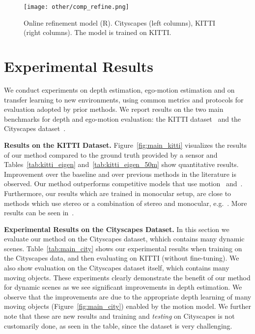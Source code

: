 \documentclass[10pt,twocolumn,letterpaper]{article}
\begin{document}
\begin{figure} [h!]
    \centering
    \texttt{[image: other/comp\_refine.png]}
    \caption{Online refinement model (R). Cityscapes (left columns), KITTI (right columns). The model is trained on KITTI.
    }
    \label{fig:kitti_refinement}
\end{figure}

\section{Experimental Results}
We conduct experiments on depth estimation, ego-motion estimation and on transfer learning to new environments, using common metrics and protocols for evaluation adopted by prior methods. We report results on the two main benchmarks for depth and ego-motion evaluation: the KITTI dataset~\cite{geiger2013vision} and the Cityscapes dataset~\cite{cordts2016cityscapes}.

\textbf{Results on the KITTI Dataset.}
Figure~\ref{fig:main_kitti} visualizes the results of our method compared to the ground truth provided by a sensor and Tables~\ref{tab:kitti_eigen} and~\ref{tab:kitti_eigen_50m} show quantitative results. Improvement over the baseline and over previous methods in the literature is observed. Our method outperforms competitive models that use motion~\cite{yang2018every} and~\cite{yin2018geonet}. 
Furthermore, our results which are trained in monocular setup, are close to methods which use stereo or a combination of stereo and monocular, e.g.~\cite{godard2017monodepth,yang2018every,godard2018digging}. More results can be seen in~\cite{casser2019depth}.

\textbf{Experimental Results on the Cityscapes Dataset.}
In this section we evaluate our method on the Cityscapes dataset, whhich contains many dynamic scenes. Table~\ref{tab:main_city} shows our experimental results when training on the Cityscapes data, and then evaluating on KITTI (without fine-tuning). We also show evaluation on the Cityscapes dataset itself, which contains many moving objects. These experiments clearly demonstrate the benefit of our method for dynamic scenes as we see significant improvements in depth estimation. We observe that the improvements are due to the appropriate depth learning of many moving objects (Figure~\ref{fig:main_city}) enabled by the motion model. We further note that these are new results and training and {\it testing} on Cityscapes is not customarily done, as seen in the table, since the dataset is very challenging.
\end{document}
